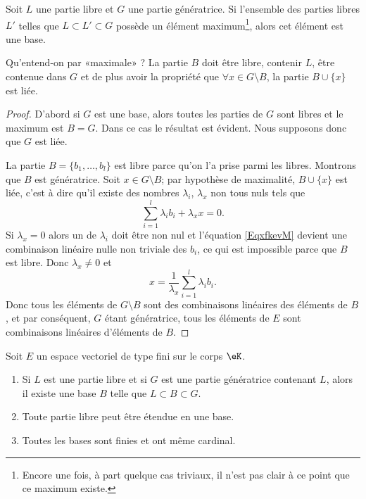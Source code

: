 \begin{lemma}   \label{LemkUfzHl}
    Soit \( L\) une partie libre et \( G\) une partie génératrice. Si l'ensemble des parties libres \( L'\) telles que \( L\subset L'\subset G\) possède un élément maximum\footnote{Encore une fois, à part quelque cas triviaux, il n'est pas clair à ce point que ce maximum existe.}, alors cet élément est une base.
\end{lemma}
Qu'entend-on par «maximale» ? La partie \( B\) doit être libre, contenir \( L\), être contenue dans \( G\) et de plus avoir la propriété que \( \forall x\in G\setminus B\), la partie \( B\cup\{ x \}\) est liée.

\begin{proof}
    D'abord si \( G\) est une base, alors toutes les parties de \( G\) sont libres et le maximum est \( B=G\). Dans ce cas le résultat est évident. Nous supposons donc que \( G\) est liée.

    La partie \( B=\{ b_1,\ldots, b_l \}\) est libre parce qu'on l'a prise parmi les libres. Montrons que \( B\) est génératrice. Soit \( x\in G\setminus B\); par hypothèse de maximalité, \( B\cup\{ x \}\) est liée, c'est à dire qu'il existe des nombres \( \lambda_i\), \( \lambda_x\) non tous nuls tels que
    \begin{equation}    \label{EqxfkevM}
        \sum_{i=1}^l\lambda_ib_i+\lambda_xx=0.
    \end{equation}
    Si \( \lambda_x=0\) alors un de \( \lambda_i\) doit être non nul et l'équation \eqref{EqxfkevM} devient une combinaison linéaire nulle non triviale des \( b_i\), ce qui est impossible parce que \( B\) est libre. Donc \( \lambda_x\neq 0\) et
    \begin{equation}
        x=\frac{1}{ \lambda_x }\sum_{i=1}^l\lambda_ib_i.
    \end{equation}
    Donc tous les éléments de \( G\setminus B\) sont des combinaisons linéaires des éléments de \( B\), et par conséquent, \( G\) étant génératrice, tous les éléments de \( E\) sont combinaisons linéaires d'éléments de \( B\). 
\end{proof}

\begin{theorem} \label{ThonmnWKs}
    Soit \( E\) un espace vectoriel de type fini sur le corps \( \eK\).
    \begin{enumerate}
        \item   \label{ItemBazxTZ}
            Si \( L\) est une partie libre et si \( G\) est une partie génératrice contenant \( L\), alors il existe une base \( B\) telle que \( L\subset B\subset G\).
        \item       \label{ITEMooFVJXooGzzpOu}
            Toute partie libre peut être étendue en une base.
        \item
            Toutes les bases sont finies et ont même cardinal.
    \end{enumerate}
\end{theorem}

